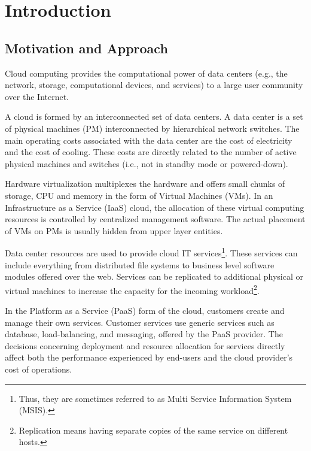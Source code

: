 \chapter{Introduction}   
 \section{Motivation and Approach}   
 Cloud computing provides the computational power of data centers (e.g., the network, storage, computational devices, and services) to a large user community over the Internet. 

	 A cloud is formed by an interconnected set of data centers. 
  A data center is a set of physical machines (PM) interconnected by hierarchical network switches.
 The main operating costs associated with the data center are the cost of electricity and the cost of cooling.   
  These costs are directly related to the number of active physical machines and switches (i.e., not in standby mode or powered-down). %
 
 Hardware virtualization multiplexes the hardware and offers small chunks of storage, CPU and memory in the form of Virtual Machines (VMs). In an Infrastructure as a Service (IaaS) cloud, the allocation of these virtual computing resources is controlled by centralized management software. The actual placement of VMs on PMs is usually hidden from upper layer entities. 
 
   Data center resources are used to provide cloud IT services\footnote{Thus, they are sometimes referred to as Multi Service Information System (MSIS)\cite{li2011fast}.}. These services can include everything from distributed file systems to business level software modules offered over the web. 
Services can be replicated to additional physical or virtual machines to increase the capacity for the incoming workload\footnote{Replication means having separate copies of the same service on different hosts.}. 

 In the Platform as a Service (PaaS) form of the cloud, customers create and manage their own services.
 Customer services use generic services such as database, load-balancing, and messaging, offered by the PaaS provider. The decisions concerning deployment and resource allocation for services directly affect both the performance experienced by end-users and the cloud provider's cost of operations.

